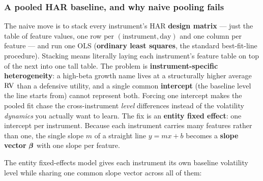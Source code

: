 \subsubsection*{A pooled HAR baseline, and why naive pooling fails}

The naive move is to stack every instrument's HAR \textbf{design matrix} --- just
the table of feature values, one row per $(\text{instrument},\text{day})$ and one
column per feature --- and run one OLS (\textbf{ordinary least squares}, the
standard best-fit-line procedure).  Stacking means literally laying each
instrument's feature table on top of the next into one tall table.  The problem is
\textbf{instrument-specific heterogeneity}: a high-beta growth name
lives at a structurally higher average $\operatorname{RV}$ than a defensive utility, and a
single common \textbf{intercept} (the baseline level the line starts from) cannot
represent both.  Forcing one intercept makes the
pooled fit chase the cross-instrument \emph{level} differences instead of the
volatility \emph{dynamics} you actually want to learn.  The fix is an
\textbf{entity fixed effect}: one intercept per instrument.  Because each
instrument carries many features rather than one, the single slope $m$ of a
straight line $y=mx+b$ becomes a \textbf{slope vector} $\bm{\beta}$ with one slope per
feature.

The entity fixed-effects model gives each instrument its own
baseline volatility level while sharing one common slope vector across all of
them:

